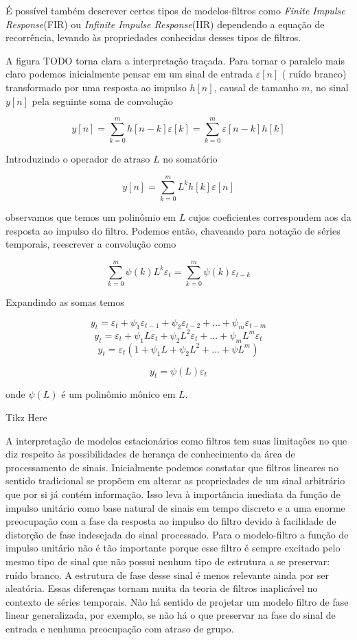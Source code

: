 É possível também descrever certos tipos de modelos-filtros como \emph{Finite
Impulse Response}(FIR) ou \emph{Infinite Impulse Response}(IIR) dependendo
a equação de recorrência, levando às propriedades conhecidas desses tipos de
filtros.

A figura TODO torna clara a interpretação traçada. Para tornar o paralelo mais
claro podemos inicialmente pensar em um sinal de entrada $\varepsilon[n]$ (
ruído branco) transformado por uma resposta ao impulso $h[n]$, causal de
tamanho $m$, no sinal $y[n]$ pela seguinte soma de convolução

$$ y[n] = \sum^{m}_{k=0} h[n-k]\varepsilon[k] =  \sum^{m}_{k=0} \varepsilon[n-k]h[k]$$

Introduzindo o operador de atraso $L$ no somatório

$$ y[n] = \sum^{m}_{k=0} L^{k}h[k] \varepsilon[n]$$

observamos que temos um polinômio em $L$ cujos coeficientes correspondem aos
da resposta ao impulso do filtro. Podemos então, chaveando para notação de
séries temporais, reescrever a convolução como

$$ \sum^{m}_{k=0} \psi(k)L^k\varepsilon_{t} = \sum^{m}_{k=0} \psi(k)\varepsilon_{t-k}$$

Expandindo as somas temos

$$ y_t = \varepsilon_t + \psi_1 \varepsilon_{t-1} + \psi_2 \varepsilon_{t-2} + ... +  \psi_m \varepsilon_{t-m}$$
$$ y_t = \varepsilon_t + \psi_1 L\varepsilon_{t} + \psi_2 L^2 \varepsilon_{t} + ... +  \psi_m L^m \varepsilon_{t}$$
$$ y_t = \varepsilon_t(1 + \psi_1 L + \psi_2 L^2 + ... + \psi L^m)$$

\begin{equation}\label{eq:fir}
    y_t = \psi(L)\varepsilon_t
\end{equation}

onde $\psi(L)$ é um polinômio mônico em $L$.

Tikz Here


A interpretação de modelos estacionários como filtros tem suas limitações no
que diz respeito às possibilidades de herança de conhecimento da área de
processamento de sinais. Inicialmente podemos constatar que filtros lineares no
sentido tradicional se propõem em alterar as propriedades de um sinal
arbitrário que por si já contém informação. Isso leva à importância imediata da
função de impulso unitário como base natural de sinais em tempo discreto e a
uma enorme preocupação com a fase da resposta ao impulso do filtro devido à
facilidade de distorção de fase indesejada do sinal processado. Para o
modelo-filtro a função de impulso unitário não é tão importante porque esse
filtro é sempre excitado pelo mesmo tipo de sinal que não possui nenhum tipo de
estrutura a se preservar: ruído branco. A estrutura de fase desse sinal é menos
relevante ainda por ser aleatória. Essas diferenças tornam muita da teoria de
filtros inaplicável no contexto de séries temporais. Não há sentido de projetar
um modelo filtro de fase linear generalizada, por exemplo, se não há o que
preservar na fase do sinal de entrada e nenhuma preocupação com atraso de grupo.

